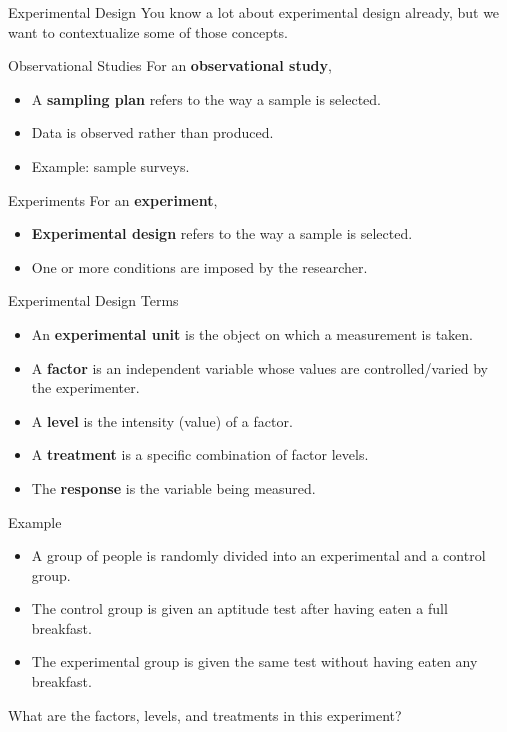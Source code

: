 \begin{frame}{Experimental Design}
    You know a lot about experimental design already, but we want to contextualize some of those concepts.
\end{frame}

\begin{frame}{Observational Studies}
    For an \textbf{observational study},
    \begin{itemize}
        \item A \textbf{sampling plan} refers to the way a sample is selected.
        \item Data is observed rather than produced.
        \item Example: sample surveys.
    \end{itemize}
\end{frame}

\begin{frame}{Experiments}
    For an \textbf{experiment}, 
    \begin{itemize}
        \item \textbf{Experimental design} refers to the way a sample is selected.
        \item One or more conditions are imposed by the researcher.
    \end{itemize}
\end{frame}

\begin{frame}{Experimental Design Terms}
    \begin{itemize}
        \item An \textbf{experimental unit} is the object on which a measurement is taken.
        \item A \textbf{factor} is an independent variable whose values are controlled/varied by the experimenter. 
        \item A \textbf{level} is the intensity (value) of a factor.
        \item A \textbf{treatment} is a specific combination of factor levels.
        \item The \textbf{response} is the variable being measured. 
    \end{itemize}
\end{frame}

\begin{frame}{Example}
    \begin{itemize}
        \item A group of people is randomly divided into an experimental and a control group. 
        \item The control group is given an aptitude test after having eaten a full breakfast. 
        \item The experimental group is given the same test without having eaten any breakfast. 
    \end{itemize}
    What are the factors, levels, and treatments in this experiment?
\end{frame}

